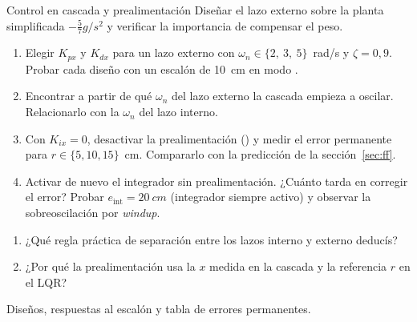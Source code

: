 \label{pr:cascada}
\begin{practica}{Control en cascada y prealimentación}
\objetivos Diseñar el lazo externo sobre la planta simplificada $-\tfrac57g/s^2$ y verificar la importancia de compensar el peso.
\procedimiento
\begin{enumerate}
  \item Elegir $K_{px}$ y $K_{dx}$ para un lazo externo con $\omega_n\in\{2,\ 3,\ 5\}$~rad/s y $\zeta=0{,}9$. Probar cada diseño con un escalón de \SI{10}{cm} en modo .
  \item Encontrar a partir de qué $\omega_n$ del lazo externo la cascada empieza a oscilar. Relacionarlo con la $\omega_n$ del lazo interno.
  \item Con $K_{ix}=0$, desactivar la prealimentación () y medir el error permanente para $r\in\{5,10,15\}$~cm. Compararlo con la predicción de la sección~\ref{sec:ff}.
  \item Activar de nuevo el integrador sin prealimentación. ¿Cuánto tarda en corregir el error? Probar $e_{\text{int}}=\SI{20}{cm}$ (integrador siempre activo) y observar la sobreoscilación por \emph{windup}.
\end{enumerate}
\preguntas
\begin{enumerate}
  \item ¿Qué regla práctica de separación entre los lazos interno y externo deducís?
  \item ¿Por qué la prealimentación usa la $x$ medida en la cascada y la referencia $r$ en el LQR?
\end{enumerate}
\entregables Diseños, respuestas al escalón y tabla de errores permanentes.
\end{practica}

